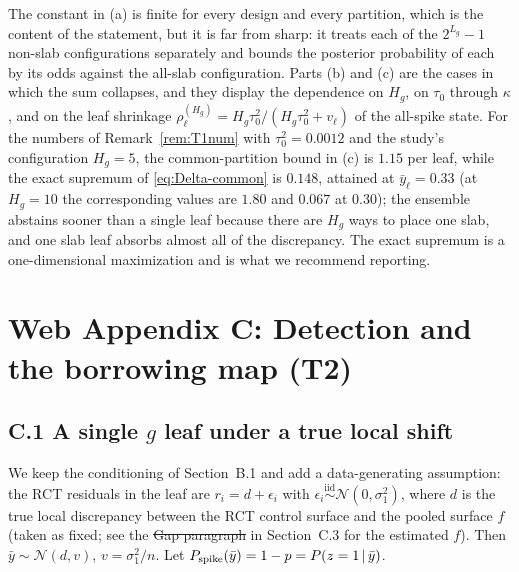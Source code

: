 \documentclass[11pt]{article}
\newcommand{\Normal}{\mathcal{N}}
\newcommand{\given}{\,\vert\,}
\newcommand{\iid}{\stackrel{\text{iid}}{\sim}}
\theoremstyle{definition}
\theoremstyle{plain}
\providecommand{\DIFaddtex}[1]{{\protect\color{blue}\uwave{#1}}} %
\providecommand{\DIFdeltex}[1]{{\protect\color{red}\sout{#1}}}                      %
\providecommand{\DIFaddbegin}{} %
\providecommand{\DIFaddend}{} %
\providecommand{\DIFdelbegin}{} %
\providecommand{\DIFdelend}{} %
\providecommand{\DIFadd}[1]{\texorpdfstring{\DIFaddtex{#1}}{#1}} %
\providecommand{\DIFdel}[1]{\texorpdfstring{\DIFdeltex{#1}}{}} %
\newcommand{\DIFscaledelfig}{0.5}
\newlength{\DIFdelgraphicswidth} %
\newlength{\DIFdelgraphicsheight} %
\newcommand{\DIFaddincludegraphics}[2][]{{\color{blue}\fbox{\DIFOincludegraphics[#1]{#2}}}} %
\newcommand{\DIFdelincludegraphics}[2][]{%
\sbox{\DIFdelgraphicsbox}{\DIFOincludegraphics[#1]{#2}}%
\settoboxwidth{\DIFdelgraphicswidth}{\DIFdelgraphicsbox} %
\settoboxtotalheight{\DIFdelgraphicsheight}{\DIFdelgraphicsbox} %
\scalebox{\DIFscaledelfig}{%
\parbox[b]{\DIFdelgraphicswidth}{\usebox{\DIFdelgraphicsbox}\\[-\baselineskip] \rule{\DIFdelgraphicswidth}{0em}}\llap{\resizebox{\DIFdelgraphicswidth}{\DIFdelgraphicsheight}{%
\setlength{\unitlength}{\DIFdelgraphicswidth}%
\begin{picture}(1,1)%
\thicklines\linethickness{2pt} %
{\color[rgb]{1,0,0}\put(0,0){\framebox(1,1){}}}%
{\color[rgb]{1,0,0}\put(0,0){\line( 1,1){1}}}%
{\color[rgb]{1,0,0}\put(0,1){\line(1,-1){1}}}%
\end{picture}%
}\hspace*{3pt}}} %
} %
\DeclareRobustCommand{\DIFaddbegin}{\DIFOaddbegin \let\includegraphics\DIFaddincludegraphics} %
\DeclareRobustCommand{\DIFaddend}{\DIFOaddend \let\includegraphics\DIFOincludegraphics} %
\DeclareRobustCommand{\DIFdelbegin}{\DIFOdelbegin \let\includegraphics\DIFdelincludegraphics} %
\DeclareRobustCommand{\DIFdelend}{\DIFOaddend \let\includegraphics\DIFOincludegraphics} %
\begin{document}
{\begin{remA}\label{rem:constants}
The constant in (a) is finite for every design and every partition, which is the content of the statement, but it is far from sharp: it treats each of the $2^{L_g}-1$ non-slab configurations separately and bounds the posterior probability of each by its odds against the all-slab configuration. Parts (b) and (c) are the cases in which the sum collapses, and they display the dependence on $H_g$, on $\tau_0$ through $\kappa$, and on the leaf shrinkage $\rho^{(H_g)}_\ell=H_g\tau_0^2/(H_g\tau_0^2+v_\ell)$ of the all-spike state. For the numbers of Remark~\ref{rem:T1num} with $\tau_0^2=0.0012$ and the study's configuration $H_g=5$, the common-partition bound in (c) is $1.15$ per leaf, while the exact supremum of \eqref{eq:Delta-common} is $0.148$, attained at $\bar y_\ell=0.33$ (at $H_g=10$ the corresponding values are $1.80$ and $0.067$ at $0.30$); the ensemble abstains sooner than a single leaf because there are $H_g$ ways to place one slab, and one slab leaf absorbs almost all of the discrepancy. The exact supremum is a one-dimensional maximization and is what we recommend reporting.
\end{remA}

\section*{Web Appendix C: Detection and the borrowing map (T2)}

\subsection*{C.1 A single $g$ leaf under a true local shift}

We keep the conditioning of Section~B.1 and add a data-generating assumption: the RCT residuals in the leaf are $r_i=d+\epsilon_i$ with $\epsilon_i\iid\Normal(0,\sigma_1^2)$, where $d$ is the true local discrepancy between the RCT control surface and the pooled surface $f$ (taken as fixed; see the \DIFdelbegin \DIFdel{Gap paragraph }\DIFdelend \DIFaddbegin \DIFadd{scope discussion }\DIFaddend in Section~C.3 for the estimated $f$). Then $\bar y\sim\Normal(d,v)$, $v=\sigma_1^2/n$. Let $\Pspike(\bar y)=1-p=P(z=1\given\bar y)$.

}
\end{document}
